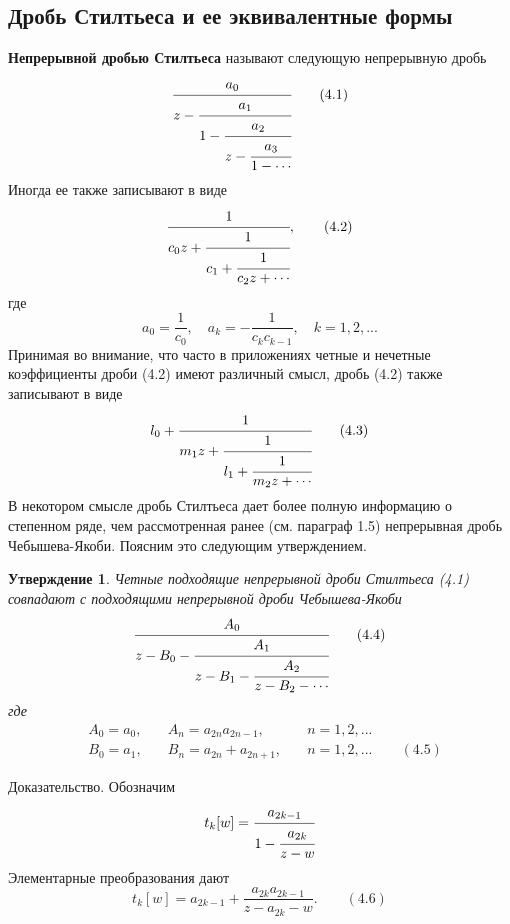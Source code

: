 \documentclass[12 pt, a4 paper]{article}
\theoremstyle{plain}   \newtheorem{Pro}{Задача}
\newtheorem{Sta}{Утверждение}
\begin{document}
\subsection{Дробь Стилтьеса и ее эквивалентные формы}
{\bfseries Непрерывной дробью Стилтьеса}
называют следующую непрерывную
дробь
\begin{equation*}
  \cfrac{a_0}{z-
    \cfrac{a_1}{1-
	  \cfrac{a_2}{z-
	    \cfrac{a_3}{1-\dotsb
  }}}}
  \qquad (4.1)
\end{equation*}
Иногда ее также записывают в виде
\begin{equation*}
  \cfrac{1}{c_0 z+
    \cfrac{1}{c_1 +
	  \cfrac{1}{c_2 z+\dotsb
  }}},
  \qquad (4.2)
\end{equation*}
где
\begin{equation*}
  a_0 =\frac{1}{c_0}, \quad
  a_k =-\frac{1}{c_k c_{k-1}}, \quad k=1,2,...
\end{equation*}
Принимая во внимание, что часто в приложениях
четные и нечетные коэффициенты дроби (4.2) имеют
различный смысл, дробь (4.2) также записывают в виде
\begin{equation*}
  l_0 +
    \cfrac{1}{m_1 z+
	  \cfrac{1}{l_1 +
	    \cfrac{1}{m_2 z+ \dotsb
	}}}
	\qquad (4.3)
\end{equation*}
В некотором смысле дробь Стилтьеса дает более полную
информацию о степенном ряде, чем рассмотренная ранее
(см. параграф 1.5) непрерывная дробь Чебышева-Якоби.
Поясним это следующим утверждением.
\begin{Sta}
Четные подходящие непрерывной дроби Стилтьеса (4.1)
совпадают с подходящими непрерывной дроби Чебышева-Якоби
\begin{equation*}
  \cfrac{A_0}{z-B_0 -
    \cfrac{A_1}{z-B_1 -
	  \cfrac{A_2}{z-B_2 - \dotsb
  }}}
  \qquad (4.4)
\end{equation*}
где
\begin{align*}
  & A_0 =a_0 , \quad & A_n =a_{2n}a_{2n-1}, \quad & n=1,2,...\\
  & B_0 =a_1 , \quad & B_n =a_{2n}+a_{2n+1}, \quad & n=1,2,...
  \qquad (4.5)
\end{align*}
\end{Sta}  	    		    	        						      				
{\Large Доказательство.}
Обозначим
\begin{equation*}
  t_k [w]=\cfrac{a_{2k-1}}{1-
            \cfrac{a_{2k}}{z-w}}
\end{equation*}
Элементарные преобразования дают
\begin{equation*}
  t_k [w]=a_{2k-1}+
  \frac{a_{2k}a_{2k-1}}{z-a_{2k}-w}.
  \qquad (4.6)
\end{equation*}
\end{document}
